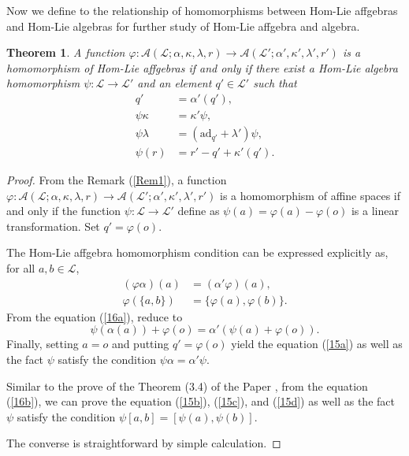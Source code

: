 \documentclass[14pt]{article}
\newtheorem{Thm}[thm]{Theorem}
\theoremstyle{Definition}
\theoremstyle{remark}
\begin{document}
Now we define to the relationship of homomorphisms between Hom-Lie affgebras and Hom-Lie algebras for further study of Hom-Lie affgebra and algebra.

\begin{Thm}\label{Thm6.8}
A function 
$\varphi : \mathcal{A}(\mathcal{L}; \alpha, \kappa, \lambda, r) \longrightarrow \mathcal{A}(\mathcal{L}'; \alpha', \kappa', \lambda', r')$
is a homomorphism of Hom-Lie affgebras if and only if there exist a Hom-Lie algebra homomorphism 
$
\psi : \mathcal{L} \longrightarrow \mathcal{L}'$
and an element $q' \in \mathcal{L}'$ such that
\begin{subequations}\label{15abcd}
\begin{align}
q' &= \alpha'(q'), \label{15a}\\
\psi \kappa &= \kappa' \psi, \label{15b}\\
\psi \lambda &= (\mathrm{ad}_{q'} + \lambda') \psi, \label{15c}\\
\psi(r) &= r' - q' + \kappa'(q'). \label{15d}
\end{align}
\end{subequations}
\end{Thm}

\begin{proof}
From the Remark (\ref{Rem1}), a function $\varphi:\mathcal{A}(\mathcal{L};\alpha,\kappa,\lambda,r)\longrightarrow\mathcal{A}(\mathcal{L}';\alpha',\kappa',\lambda',r')$ is a homomorphism of affine spaces if and only if the function $\psi:\mathcal{L}\rightarrow\mathcal{L}'$ define as $\psi(a)=\varphi(a)-\varphi(o)$ is a linear transformation. Set $q'=\varphi(o)$.

The Hom-Lie affgebra homomorphism condition can be expressed explicitly as, for all $a,b\in \mathcal{L}$,
\begin{subequations}
\begin{align}
(\varphi\alpha)(a)&=(\alpha'\varphi)(a),\label{16a}\\
\varphi(\{a,b\})&=\{\varphi(a),\varphi(b)\}\label{16b}.
\end{align}
\end{subequations}
From the equation (\ref{16a}), reduce to 
$$
\psi(\alpha(a))+\varphi(o)=\alpha'(\psi(a)+\varphi(o)).
$$
Finally, setting $a=o$ and putting $q'=\varphi(o)$ yield the equation (\ref{15a}) as well as the fact $\psi$ satisfy the condition $\psi\alpha=\alpha'\psi$.

Similar to the prove of the Theorem (3.4) of the Paper \textbf{ \cite{And2}}, from the equation (\ref{16b}), we can prove the equation (\ref{15b}), (\ref{15c}), and (\ref{15d}) as well as the fact $\psi$ satisfy the condition $\psi[a,b]=[\psi(a),\psi(b)]$.

The converse is straightforward by simple calculation.
\end{proof}
\end{document}
